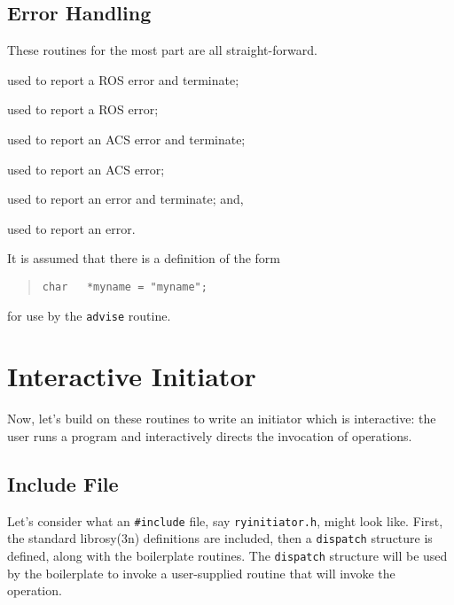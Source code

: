 \subsection	{Error Handling}
These routines for the most part are all straight-forward.
\begin{describe}
\item[\verb"ros\_adios":] used to report a ROS error and terminate;

\item[\verb"ros\_advise":] used to report a ROS error;

\item[\verb"acs\_adios":] used to report an ACS error and terminate;

\item[\verb"acs\_advise":] used to report an ACS error;

\item[\verb"adios":] used to report an error and terminate;
and,

\item[\verb"advise":] used to report an error.
\end{describe}
It is assumed that there is a definition of the form
\begin{quote}\small\begin{verbatim}
char   *myname = "myname";
\end{verbatim}\end{quote}
for use by the \verb"advise" routine.

\newpage

\section	{Interactive Initiator}
Now, let's build on these routines to write an initiator which is interactive:
the user runs a program and interactively directs the invocation of
operations.

\subsection	{Include File}
Let's consider what an \verb"#include" file, say \verb"ryinitiator.h",
might look like.
First, the standard \man librosy(3n) definitions are included,
then a \verb"dispatch" structure is defined,
along with the boilerplate routines.
The \verb"dispatch" structure will be used by the boilerplate to invoke a
user-supplied routine that will invoke the operation.

